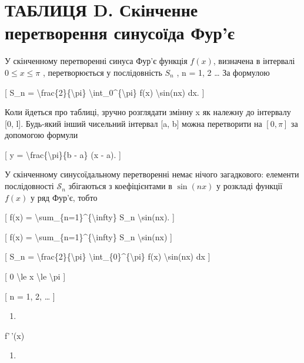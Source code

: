 \documentclass[
]{article}
\providecommand{\tightlist}{%
  \setlength{\itemsep}{0pt}\setlength{\parskip}{0pt}}
\begin{document}
{\section{ТАБЛИЦЯ D. Скінченне перетворення синусоїда
Фур'є}\label{ux442ux430ux431ux43bux438ux446ux44f-d.-ux441ux43aux456ux43dux447ux435ux43dux43dux435-ux43fux435ux440ux435ux442ux432ux43eux440ux435ux43dux43dux44f-ux441ux438ux43dux443ux441ux43eux457ux434ux430-ux444ux443ux440ux454}

У скінченному перетворенні синуса Фур'є функція \(f(x)\), визначена в
інтервалі \(0 \le x \le \pi\) , перетворюється у послідовність \(S_n\) ,
n = 1, 2 \ldots{} За формулою

{[} S\_n = \textbackslash frac\{2\}\{\textbackslash pi\}
\textbackslash int\_0\^{}\{\textbackslash pi\} f(x)
\textbackslash sin(nx) dx. {]}

Коли йдеться про таблиці, зручно розглядати змінну x як належну до
інтервалу {[}0, l{]}. Будь-який інший чисельний інтервал {[}a, b{]}
можна перетворити на \([0, \pi]\) за допомогою формули

{[} y = \textbackslash frac\{\textbackslash pi\}\{b - a\} (x - a). {]}

У скінченному синусоїдальному перетворенні немає нічого загадкового:
елементи послідовності \(\mathcal{S}_n\) збігаються з коефіцієнтами в
\(\sin(nx)\) у розкладі функції \(f(x)\) у ряд Фур'є, тобто

{[} f(x) = \textbackslash sum\_\{n=1\}\^{}\{\textbackslash infty\} S\_n
\textbackslash sin(nx). {]}

{[} f(x) = \textbackslash sum\_\{n=1\}\^{}\{\textbackslash infty\} S\_n
\textbackslash sin(nx) {]}

{[} S\_n = \textbackslash frac\{2\}\{\textbackslash pi\}
\textbackslash int\_\{0\}\^{}\{\textbackslash pi\} f(x)
\textbackslash sin(nx) dx {]}

{[} 0 \textbackslash le x \textbackslash le \textbackslash pi {]}

{[} n = 1, 2, \ldots{} {]}

\begin{enumerate}
\def\labelenumi{\arabic{enumi}.}
\tightlist
\item
\end{enumerate}

f'\,'(x)

\begin{enumerate}
\def\labelenumi{\arabic{enumi}.}
\setcounter{enumi}{8}
\tightlist
\item
\end{enumerate}

}
\end{document}
